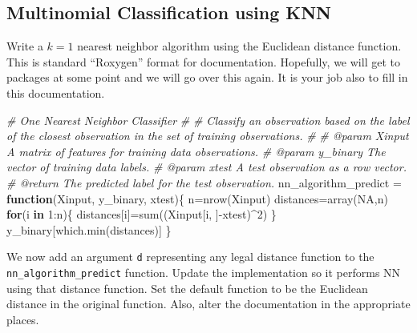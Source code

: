 \documentclass[
]{article}
\newenvironment{Shaded}{\begin{snugshade}}{\end{snugshade}}
\newcommand{\CommentTok}[1]{\textcolor[rgb]{0.56,0.35,0.01}{\textit{#1}}}
\newcommand{\ConstantTok}[1]{\textcolor[rgb]{0.00,0.00,0.00}{#1}}
\newcommand{\ControlFlowTok}[1]{\textcolor[rgb]{0.13,0.29,0.53}{\textbf{#1}}}
\newcommand{\DecValTok}[1]{\textcolor[rgb]{0.00,0.00,0.81}{#1}}
\newcommand{\FunctionTok}[1]{\textcolor[rgb]{0.00,0.00,0.00}{#1}}
\newcommand{\NormalTok}[1]{#1}
\newcommand{\OtherTok}[1]{\textcolor[rgb]{0.56,0.35,0.01}{#1}}
\newcommand{\SpecialCharTok}[1]{\textcolor[rgb]{0.00,0.00,0.00}{#1}}
\begin{document}
\hypertarget{multinomial-classification-using-knn}{%
\subsection{Multinomial Classification using
KNN}\label{multinomial-classification-using-knn}}

Write a \(k=1\) nearest neighbor algorithm using the Euclidean distance
function. This is standard ``Roxygen'' format for documentation.
Hopefully, we will get to packages at some point and we will go over
this again. It is your job also to fill in this documentation.

\begin{Shaded}
\begin{Highlighting}[]
\CommentTok{\#\textquotesingle{} One Nearest Neighbor Classifier}
\CommentTok{\#\textquotesingle{}}
\CommentTok{\#\textquotesingle{} Classify an observation based on the label of the closest observation in the set of training observations.}
\CommentTok{\#\textquotesingle{}}
\CommentTok{\#\textquotesingle{} @param Xinput      A matrix of features for training data observations.}
\CommentTok{\#\textquotesingle{} @param y\_binary    The vector of training data labels.}
\CommentTok{\#\textquotesingle{} @param xtest       A test observation as a row vector.}
\CommentTok{\#\textquotesingle{} @return            The predicted label for the test observation.}
\NormalTok{nn\_algorithm\_predict }\OtherTok{=} \ControlFlowTok{function}\NormalTok{(Xinput, y\_binary, xtest)\{}
\NormalTok{  n}\OtherTok{=}\FunctionTok{nrow}\NormalTok{(Xinput)}
\NormalTok{  distances}\OtherTok{=}\FunctionTok{array}\NormalTok{(}\ConstantTok{NA}\NormalTok{,n)}
  \ControlFlowTok{for}\NormalTok{(i }\ControlFlowTok{in} \DecValTok{1}\SpecialCharTok{:}\NormalTok{n)\{}
\NormalTok{    distances[i]}\OtherTok{=}\FunctionTok{sum}\NormalTok{((Xinput[i, ]}\SpecialCharTok{{-}}\NormalTok{xtest)}\SpecialCharTok{\^{}}\DecValTok{2}\NormalTok{)}
\NormalTok{  \}}
\NormalTok{  y\_binary[}\FunctionTok{which.min}\NormalTok{(distances)]}
\NormalTok{\}}
\end{Highlighting}
\end{Shaded}

We now add an argument \texttt{d} representing any legal distance
function to the \texttt{nn\_algorithm\_predict} function. Update the
implementation so it performs NN using that distance function. Set the
default function to be the Euclidean distance in the original function.
Also, alter the documentation in the appropriate places.
\end{document}
